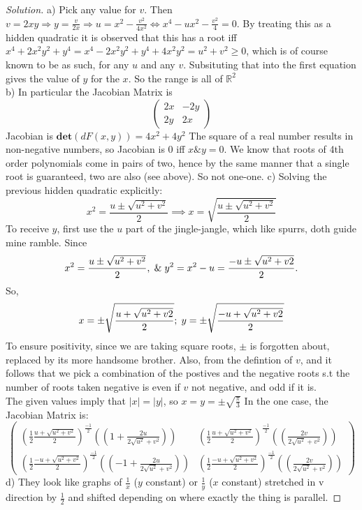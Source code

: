 \documentclass{article}
\newcommand{\R}{\mathbb{R}}
\newcommand{\ma}[1]{\mathbf{#1}}
\newenvironment{problem}[2][Problem]{\begin{trivlist}
\item[\hskip \labelsep {\bfseries #1}\hskip \labelsep {\bfseries #2.}]}{\end{trivlist}}
\newenvironment{solution}{\begin{proof}[Solution]}{\end{proof}}
\begin{document}
\begin{problem}{9.18}
\end{problem}
\begin{solution}
    a) Pick any value for $v$. Then $v =2xy \Rightarrow y = \frac{v}{2x} \Rightarrow u = x^2 -\frac{v^2}{4x^2} \iff x^4 -ux^{2} - \frac{v^2}{4} = 0$. By treating this as a hidden quadratic it is observed that this has a root iff $x^4 +2x^{2}y^{2} +y^{4} = x^{4} - 2x^{2}y^{2} + y^{4} +4x^{2}y^{2} = u^2 + v^2 \geq 0$, which is of course known to be as such, for any $u$ and any $v$. Subsituting that into the first equation gives the value of $y$ for the $x$. So the range is all of $\R^2$
  \\
    b) In particular the Jacobian Matrix is 
    \[
    \begin{pmatrix}
        2x & -2y \\
        2y & 2x
    \end{pmatrix}
    \]
    Jacobian is $\ma{det}(dF(x, y)) = 4x^2 +4y^2$  The square of a real number results in non-negative numbers, so Jacobian is 0 iff $x \& y = 0$. We know that roots of 4th order polynomials come in pairs of two, hence by the same manner that a single root is guaranteed, two are also (see above). So not one-one.
    c) Solving the previous hidden quadratic explicitly: 
    \[
    x^{2} = {\frac{u\pm\sqrt{u^{2}+v^{2}}}{2}} \implies x = \sqrt{\frac{u\pm\sqrt{u^{2}+v^{2}}}{2}}
    \]
    To receive $y$, first use the $u$ part of the jingle-jangle, which like spurrs, doth guide mine ramble. Since
    \[
    x^{2} = \frac{u \pm \sqrt{u^{2}+v^{2}}}{2}, \hspace{1mm} \& \hspace{1mm} y^{2} = x^{2} - u = \frac{-u \pm \sqrt{u^{2}+v{2}}}{2}.
     \]
    So, 
    \[
    x = \pm \sqrt{\frac{u + \sqrt{u^{2}+v{2}}}{2}}; \hspace{1mm} y = \pm \sqrt{\frac{-u + \sqrt{u^{2}+v{2}}}{2}}
    \]
    To ensure positivity, since we are taking square roots, $\pm$ is forgotten about, replaced by its more handsome brother. Also, from the defintion of $v$, and it follows that we pick a combination of the postives and the negative roots s.t the number of roots taken negative is even if $v$ not negative, and odd if it is.
    \\
    The given values imply that $|x| = |y|$, so $x = y = \pm \sqrt{\frac{\pi}{3}}$
    In the one case, the Jacobian Matrix is:
    \[
    \begin{pmatrix}
        \left( \frac{1}{2}\frac{u +\sqrt{u^{2} + v^{2}}}{2}\right)^{\frac{-1}{2}}\left((1+\frac{2u}{2\sqrt{u^{2}}+v^{2}})\right)  & \left( \frac{1}{2}\frac{u +\sqrt{u^{2} + v^{2}}}{2}\right)^{\frac{-1}{2}}\left((\frac{2v}{2\sqrt{u^{2}}+v^{2}})\right)\\
        \left( \frac{1}{2}\frac{-u +\sqrt{u^{2} + v^{2}}}{2}\right)^{\frac{-1}{2}}\left((-1+\frac{2u}{2\sqrt{u^{2}}+v^{2}})\right)   &\left( \frac{1}{2}\frac{-u +\sqrt{u^{2} + v^{2}}}{2}\right)^{\frac{-1}{2}}\left((\frac{2v}{2\sqrt{u^{2}}+v^{2}})\right)
    \end{pmatrix}
    \]
    d) They look like graphs of $\frac{1}{x}$ ($y$ constant) or $\frac{1}{y}$ ($x$ constant) stretched in v direction by $\frac{1}{2}$ and shifted depending on where exactly the thing is parallel.
\end{solution}
\end{document}
